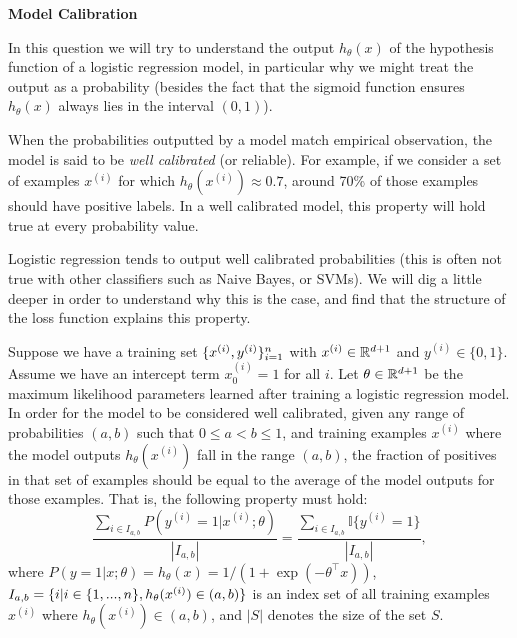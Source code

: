 \item {} {\bf Model Calibration}

In this question we will try to understand the output $h_\theta(x)$ of the
hypothesis function of a logistic regression model, in particular why we might
treat the output as a probability (besides the fact that the sigmoid function
ensures $h_\theta(x)$ always lies in the interval $(0, 1)$).

When the probabilities outputted by a model match empirical observation, the
model is said to be \emph{well calibrated} (or reliable). For example, if we
consider a set of examples $x^{(i)}$ for which $h_\theta(x^{(i)})  \approx
0.7$, around 70\% of those examples should have positive labels. In a
well calibrated model, this property will hold true at every probability value.

Logistic regression tends to output well calibrated probabilities (this is
often not true with other classifiers such as Naive Bayes, or SVMs). We will
dig a little deeper in order to understand why this is the case, and find that
the structure of the loss function explains this property.

Suppose we have a training set $\{x^{(i)},y^{(i)}\}_{i=1}^{n}$ with
$x^{(i)} \in \mathbb{R}^{{d}+1}$ and $y^{(i)} \in \{0, 1\}$. Assume we have an
intercept term $x_0^{(i)} = 1$ for all $i$. Let $\theta \in \mathbb{R}^{{d}+1}$
be the maximum likelihood parameters learned after training a logistic
regression model. In order for the model to be considered well calibrated,
given any range of probabilities $(a, b)$ such that $0 \le a < b \le 1$, and
training examples $x^{(i)}$ where the model outputs $h_\theta(x^{(i)})$ fall in
the range $(a, b)$, the fraction of positives in that set of examples should be
equal to the average of the model outputs for those examples. That is, the
following property must hold:
$$
  \frac{\sum_{i\in I_{a,b}}  P\left(y^{(i)}=1|x^{(i)};\theta\right)}
       {|I_{a,b}|}
  = \frac{\sum_{i\in I_{a,b}} \mathbb{I}\{y^{(i)} = 1\}}
         {|I_{a,b}|},
$$
where $P(y=1|x;\theta) = h_\theta(x) = 1/(1+\exp(-\theta^\top x))$, $I_{a,b} =
\{ i | i \in \{1,...,{n}\},  h_\theta(x^{(i)}) \in (a,b)\} $ is an index set of
all training examples $x^{(i)}$ where $h_\theta(x^{(i)}) \in (a,b)$, and $|S|$
denotes the size of the set $S$.

\begin{enumerate}
  

\ifnum{} {
  
} \fi

  

\ifnum{} {
  
} \fi


  

\ifnum{} {
  
} \fi

\end{enumerate}

